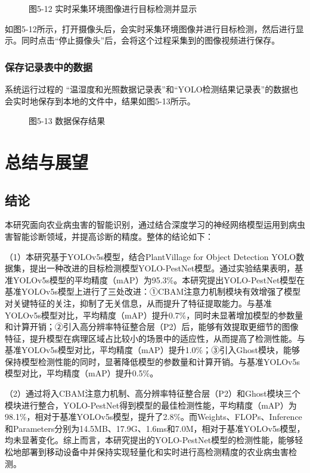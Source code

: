\documentclass[12pt, a4paper, twoside]{ctexart}
\begin{document}
\begin{figure}[htbp]
\centering
\caption{图5-12 实时采集环境图像进行目标检测并显示}
\end{figure}

如图5-12所示，打开摄像头后，会实时采集环境图像并进行目标检测，然后进行显示。同时点击“停止摄像头”后，会将这个过程采集到的图像视频进行保存。


\subsection{保存记录表中的数据}

系统运行过程的 “温湿度和光照数据记录表”和“YOLO检测结果记录表”的数据也会实时地保存到本地的文件中，结果如图5-13所示。


\begin{figure}[htbp]
\centering
\caption{图5-13 数据保存结果}
\end{figure}


\chapter{总结与展望}


\section{结论}

本研究面向农业病虫害的智能识别，通过结合深度学习的神经网络模型运用到病虫害智能诊断领域，并提高诊断的精度。整体的结论如下：

（1）本研究基于YOLOv5s模型，结合PlantVillage for Object Detection YOLO数据集，提出一种改进的目标检测模型YOLO-PestNet模型。通过实验结果表明，基准YOLOv5s模型的平均精度（mAP）为95.3\%。本研究提出YOLO-PestNet模型在基准YOLOv5s模型上进行了三处改进：①CBAM注意力机制模块有效增强了模型对关键特征的关注，抑制了无关信息，从而提升了特征提取能力。与基准YOLOv5s模型对比，平均精度（mAP）提升0.7\%，同时未显著增加模型的参数量和计算开销；②引入高分辨率特征整合层（P2）后，能够有效提取更细节的图像特征，提升模型在病理区域占比较小的场景中的适应性，从而提高了检测性能。与基准YOLOv5s模型对比，平均精度（mAP）提升1.0\%；③引入Ghost模块，能够保持模型检测性能的同时，显著降低模型的参数量和计算开销。与基准YOLOv5s模型对比，平均精度（mAP）提升0.5\%。

（2）通过将入CBAM注意力机制、高分辨率特征整合层（P2）和Ghost模块三个模块进行整合，YOLO-PestNet得到模型的最佳检测性能，平均精度（mAP）为98.1\%，相对于基准YOLOv5s模型，提升了2.8\%。而Weights、FLOPs、Inference和Parameters分别为14.5MB、17.9G、1.6ms和7.0M，相对于基准YOLOv5s模型，均未显著变化。综上而言，本研究提出的YOLO-PestNet模型的检测性能，能够轻松地部署到移动设备中并保持实现轻量化和实时进行高检测精度的农业病虫害检测。
\end{document}
